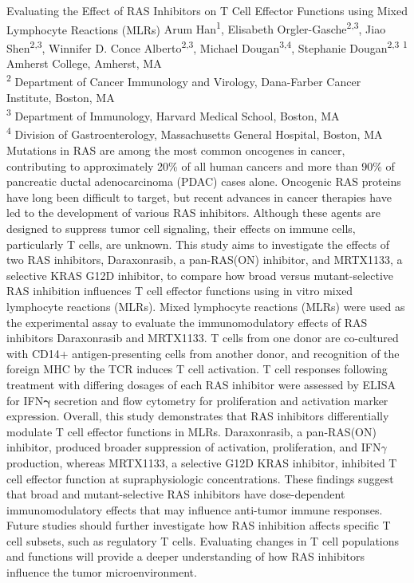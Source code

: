 \makeabstract
    {
    Evaluating the Effect of RAS Inhibitors on T Cell Effector Functions using Mixed Lymphocyte Reactions (MLRs)
    }
    {
    Arum Han\textsuperscript{1}, Elisabeth Orgler-Gasche\textsuperscript{2,3}, Jiao Shen\textsuperscript{2,3}, Winnifer D. Conce Alberto\textsuperscript{2,3}, Michael Dougan\textsuperscript{3,4}, Stephanie Dougan\textsuperscript{2,3}
    }
    {
    \textsuperscript{1} Amherst College, Amherst, MA\\
\textsuperscript{2} Department of Cancer Immunology and Virology, Dana-Farber Cancer Institute, Boston, MA\\
\textsuperscript{3} Department of Immunology, Harvard Medical School, Boston, MA\\
\textsuperscript{4} Division of Gastroenterology, Massachusetts General Hospital, Boston, MA
    }
    {
    Mutations in RAS are among the most common oncogenes in cancer, contributing to approximately 20\% of all human cancers and more than 90\% of pancreatic ductal adenocarcinoma (PDAC) cases alone. Oncogenic RAS proteins have long been difficult to target, but recent advances in cancer therapies have led to the development of various RAS inhibitors. Although these agents are designed to suppress tumor cell signaling, their effects on immune cells, particularly T cells, are unknown. This study aims to investigate the effects of two RAS inhibitors, Daraxonrasib, a pan-RAS(ON) inhibitor, and MRTX1133, a selective KRAS G12D inhibitor, to compare how broad versus mutant-selective RAS inhibition influences T cell effector functions using in vitro mixed lymphocyte reactions (MLRs). 
    }
    {
    Mixed lymphocyte reactions (MLRs) were used as the experimental assay to evaluate the immunomodulatory effects of RAS inhibitors Daraxonrasib and MRTX1133. T cells from one donor are co-cultured with CD14+ antigen-presenting cells from another donor, and recognition of the foreign MHC by the TCR induces T cell activation. T cell responses following treatment with differing dosages of each RAS inhibitor were assessed by ELISA for IFN\ensuremath{\boldsymbol{\gamma}} secretion and flow cytometry for proliferation and activation marker expression.
    }
    {
    Overall, this study demonstrates that RAS inhibitors differentially modulate T cell effector functions in MLRs. Daraxonrasib, a pan-RAS(ON) inhibitor, produced broader suppression of activation, proliferation, and IFN\ensuremath{\gamma} production, whereas MRTX1133, a selective G12D KRAS inhibitor, inhibited T cell effector function at supraphysiologic concentrations. 
    }
    {
    These findings suggest that broad and mutant-selective RAS inhibitors have dose-dependent immunomodulatory effects that may influence anti-tumor immune responses. Future studies should further investigate how RAS inhibition affects specific T cell subsets, such as regulatory T cells. Evaluating changes in T cell populations and functions will provide a deeper understanding of how RAS inhibitors influence the tumor microenvironment.
    }

    \newpage
    
